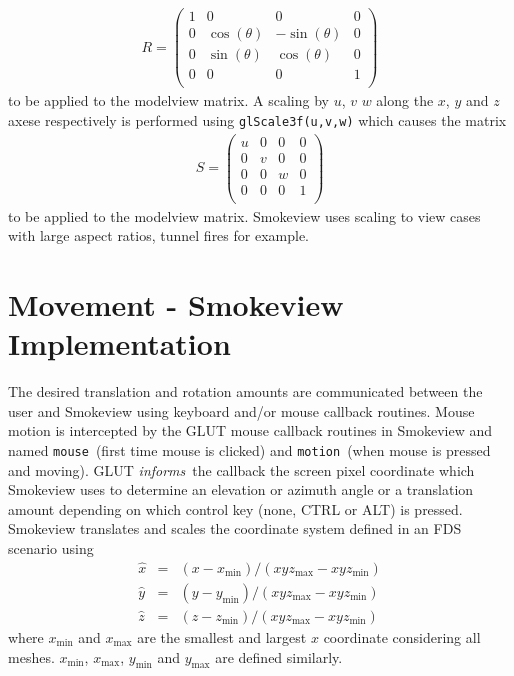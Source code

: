 \documentclass[11pt,twoside]{book}
\begin{document}
\begin{eqnarray*}
R=\left(%
\begin{array}{cccc}
  1 & 0 & 0 & 0 \\
  0 & \cos(\theta) & -\sin(\theta) & 0 \\
  0 & \sin(\theta) & \cos(\theta) & 0 \\
  0 & 0 & 0 & 1 \\
\end{array}%
\right)
\end{eqnarray*}
to be applied to the modelview matrix.  A scaling by $u$, $v$ $w$
along the $x$, $y$ and $z$ axese respectively is performed using
{\tt glScale3f(u,v,w)} which causes the matrix
\begin{eqnarray*}
S=\left(%
\begin{array}{cccc}
  u & 0 & 0 & 0 \\
  0 & v & 0 & 0 \\
  0 & 0 & w & 0 \\
  0 & 0 & 0 & 1 \\
\end{array}%
\right)
\end{eqnarray*}
to be applied to the modelview matrix.  Smokeview uses scaling to
view cases with large aspect ratios, tunnel fires for example.

\section{Movement - Smokeview Implementation}
The desired translation and rotation amounts are communicated
between the user and Smokeview using keyboard and/or mouse
callback routines.  Mouse motion is intercepted by the GLUT
mouse callback routines in Smokeview and named {\tt mouse}\ (first time mouse is clicked) and {\tt motion}\
(when mouse is pressed and moving).  GLUT {\em informs}\ the callback the screen pixel coordinate which Smokeview uses to determine an elevation or azimuth angle or a translation amount depending on which control key (none, CTRL or ALT) is pressed.
Smokeview translates and scales the coordinate system defined in an FDS
scenario using
\newcommand{\mmin}{\mbox{min}}
\newcommand{\mmax}{\mbox{max}}
\begin{eqnarray*}
\hat{x}&=&(x-x_{\min})/(xyz_{\max}-xyz_{\min})\\
\hat{y}&=&(y-y_{\min})/(xyz_{\max}-xyz_{\min})\\
\hat{z}&=&(z-z_{\min})/(xyz_{\max}-xyz_{\min})
\end{eqnarray*}
where $x_{\min}$ and $x_{\max}$ are the smallest and largest $x$ coordinate considering all meshes.  $x_{\min}$, $x_{\max}$, $y_{\min}$ and $y_{\max}$ are defined similarly.
\end{document}
